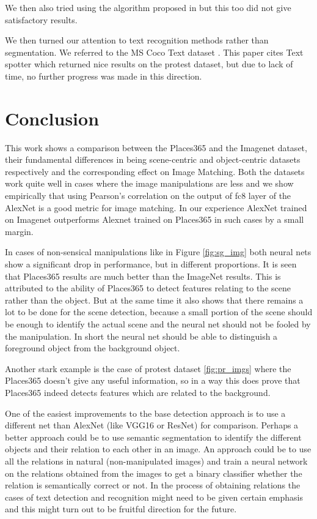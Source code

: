 \documentclass{article}
\begin{document}
We then also tried using the algorithm proposed in \cite{Felzenszwalb:2004:EGI:981793.981796} but this too did not give satisfactory results.

We then turned our attention to text recognition methods rather than segmentation. We referred to the MS Coco Text dataset \cite{veit2016cocotext}. This paper cites Text spotter\cite{Gupta16} which returned nice results on the protest dataset, but due to lack of time, no further progress was made in this direction.

\section{Conclusion}
This work shows a comparison between the Places365 and the Imagenet dataset, their fundamental differences in being scene-centric and object-centric datasets respectively and the corresponding effect on Image Matching. Both the datasets work quite well in cases where the image manipulations are less and we show empirically that using Pearson's correlation on the output of fc8 layer of the AlexNet is a good metric for image matching. In our experience AlexNet trained on Imagenet outperforms Alexnet trained on Places365 in such cases by a small margin.

In cases of non-sensical manipulations like in Figure \ref{fig:sg_img} both neural nets show a significant drop in performance, but in different proportions. It is seen that Places365 results are much better than the ImageNet results. This is attributed to the ability of Places365 to detect features relating to the scene rather than the object. But at the same time it also shows that there remains a lot to be done for the scene detection, because a small portion of the scene should be enough to identify the actual scene and the neural net should not be fooled by the manipulation. In short the neural net should be able to distinguish a foreground object from the background object.

Another stark example is the case of protest dataset \ref{fig:pr_imgs} where the Places365 doesn't give any useful information, so in a way this does prove that Places365 indeed detects features which are related to the background.

One of the easiest improvements to the base detection approach is to use a different net than AlexNet (like VGG16 or ResNet) for comparison. Perhaps a better approach could be to use semantic segmentation to identify the different objects and their relation to each other in an image. An approach could be to use all the relations in natural (non-manipulated images) and train a neural network on the relations obtained from the images to get a binary classifier whether the relation is semantically correct or not. In the process of obtaining relations the cases of text detection and recognition might need to be given certain emphasis and this might turn out to be fruitful direction for the future.




\end{document}
